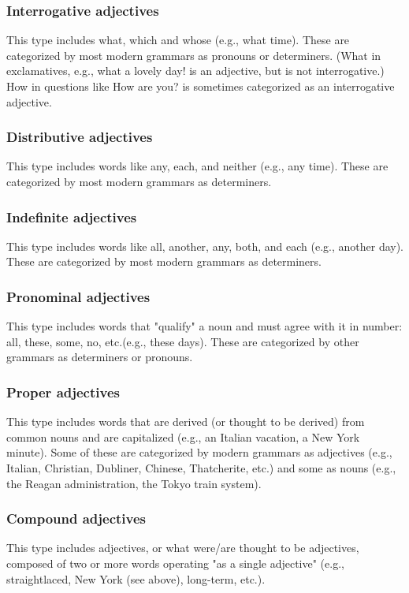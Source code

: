 \subsubsection{Interrogative adjectives \cite{wiki-eng-adjective}}
This type includes what, which and whose (e.g., what time). These are categorized by most modern grammars as pronouns or determiners. (What in exclamatives, e.g., what a lovely day! is an adjective, but is not interrogative.)\\

How in questions like How are you? is sometimes categorized as an interrogative adjective.

\subsubsection{Distributive adjectives \cite{wiki-eng-adjective}}
This type includes words like any, each, and neither (e.g., any time). These are categorized by most modern grammars as determiners.


\subsubsection{Indefinite adjectives \cite{wiki-eng-adjective}}
This type includes words like all, another, any, both, and each (e.g., another day). These are categorized by most modern grammars as determiners.

\subsubsection{Pronominal adjectives \cite{wiki-eng-adjective}}
This type includes words that "qualify" a noun and must agree with it in number: all, these, some, no, etc.(e.g., these days). These are categorized by other grammars as determiners or pronouns.


\subsubsection{Proper adjectives \cite{wiki-eng-adjective}}
This type includes words that are derived (or thought to be derived) from common nouns and are capitalized (e.g., an Italian vacation, a New York minute). Some of these are categorized by modern grammars as adjectives (e.g., Italian, Christian, Dubliner, Chinese, Thatcherite, etc.) and some as nouns (e.g., the Reagan administration, the Tokyo train system).

\subsubsection{Compound adjectives \cite{wiki-eng-adjective}}
This type includes adjectives, or what were/are thought to be adjectives, composed of two or more words operating "as a single adjective" (e.g., straightlaced, New York (see above), long-term, etc.).


